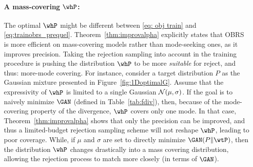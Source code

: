 \documentclass[twoside]{article}
\begin{document}
\paragraph{A mass-covering $\whP$:}
The optimal $\whP$ might be different between \eqref{eq: obj train} and \eqref{eq:trainobrs_prequel}. Theorem~\ref{thm:improvalpha} explicitly states that OBRS is more efficient on mass-covering models rather than mode-seeking ones, as it improves precision. Taking the rejection sampling into account in the training procedure is pushing the distribution $\whP$ to be more \emph{suitable} for reject, and thus: more-mode covering.  
For instance, consider a target distribution $P$ as the Gaussian mixture presented in Figure~\ref{fig:1DoptimalG}. Assume that the expressivity of $\whP$ is limited to a single Gaussian $\cal N(\mu, \sigma)$. If the goal is to naively minimize $\GAN$ (defined in Table~\ref{tab:fdiv}), then, because of the mode-covering property of the divergence, $\whP$ covers only one mode. In that case, Theorem~\ref{thm:improvalpha} shows that only the precision can be improved, and thus a limited-budget rejection sampling scheme will not reshape $\whP$, leading to poor coverage.  While, if $\mu$ and $\sigma$ are set to directly minimize $\GAN(P\Vert \wtP)$, then the distribution $\whP$ changes drastically into a mass covering distribution, allowing the rejection process to match more closely (in terms of $\GAN$).  
\end{document}
